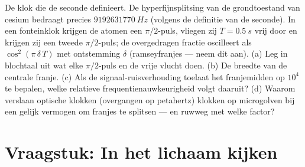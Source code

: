 \begin{exercise}[$\star\star\star$]\label{exo:b3:spin-two-level:12}
De klok die de seconde definieert. De hyperfijnsplitsing van de
grondtoestand van cesium bedraagt precies $\qty{9192631770}{Hz}$ (volgens de
definitie van de seconde). In een fonteinklok krijgen de atomen een
$\pi/2$-puls, vliegen zij $T = \qty{0.5}{s}$ vrij door en krijgen zij een
tweede $\pi/2$-puls; de overgedragen fractie oscilleert als
$\cos^2(\pi\,\delta\,T)$ met ontstemming $\delta$ (ramseyfranjes --- neem
dit aan). (a) Leg in blochtaal uit wat elke $\pi/2$-puls en de vrije
vlucht doen. (b) De breedte van de centrale franje. (c) Als de
signaal-ruisverhouding toelaat het franjemidden op $10^4$ te bepalen,
welke relatieve frequentienauwkeurigheid volgt daaruit? (d) Waarom
verslaan optische klokken (overgangen op petahertz) klokken op
microgolven bij een gelijk vermogen om franjes te splitsen --- en ruwweg
met welke factor?
\end{exercise}

\section{Vraagstuk: In het lichaam kijken}

